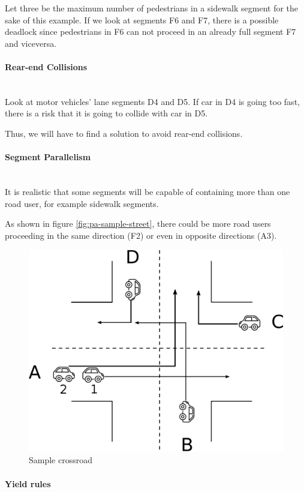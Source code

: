Let three be the maximum number of pedestrians in a sidewalk segment for the
sake of this example.
If we look at segments F6 and F7, there is a possible deadlock since
pedestrians in F6 can not proceed in an already full segment F7 and viceversa.

\paragraph{Rear-end Collisions} \mbox{} \\

Look at motor vehicles' lane segments D4 and D5. If car in D4 is going too
fast, there is a risk that it is going to collide with car in D5.

Thus, we will have to find a solution to avoid rear-end collisions.

\paragraph{Segment Parallelism} \mbox{} \\

It is realistic that some segments will be capable of containing more than one
road user, for example sidewalk segments.

As shown in figure \ref{fig:pa-sample-street}, there could be more road users
proceeding in the same direction (F2) or even in opposite directions (A3).

\begin{figure}[H]
  \centering
  \includegraphics[width=.6\columnwidth]{sections/images/analysis/crossroads.eps}
  \caption{Sample crossroad}
  \label{fig:pa-sample-crossroad}
\end{figure}

\paragraph{Yield rules} \mbox{} \\

